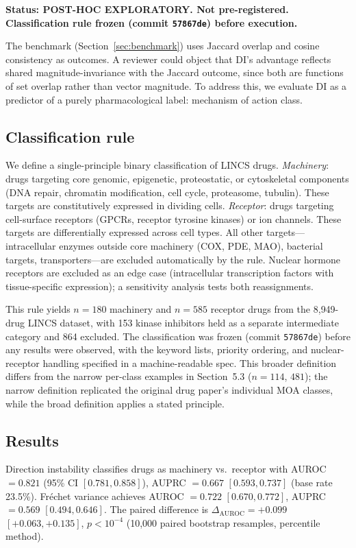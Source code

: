 \documentclass[11pt]{article}
\begin{document}
\textbf{Status: POST-HOC EXPLORATORY. Not pre-registered. Classification
rule frozen (commit \texttt{57867de}) before execution.}

The benchmark (Section~\ref{sec:benchmark}) uses Jaccard overlap and
cosine consistency as outcomes. A reviewer could object that DI's
advantage reflects shared magnitude-invariance with the Jaccard outcome,
since both are functions of set overlap rather than vector magnitude.
To address this, we evaluate DI as a predictor of a purely
pharmacological label: mechanism of action class.

\subsection{Classification rule}

We define a single-principle binary classification of LINCS drugs.
\emph{Machinery}: drugs targeting core genomic, epigenetic, proteostatic,
or cytoskeletal components (DNA repair, chromatin modification, cell
cycle, proteasome, tubulin). These targets are constitutively expressed
in dividing cells. \emph{Receptor}: drugs targeting cell-surface
receptors (GPCRs, receptor tyrosine kinases) or ion channels. These
targets are differentially expressed across cell types. All other
targets---intracellular enzymes outside core machinery (COX, PDE, MAO),
bacterial targets, transporters---are excluded automatically by the
rule. Nuclear hormone receptors are excluded as an edge case
(intracellular transcription factors with tissue-specific expression);
a sensitivity analysis tests both reassignments.

This rule yields $n = 180$ machinery and $n = 585$ receptor drugs from
the 8{,}949-drug LINCS dataset, with 153 kinase inhibitors held as a
separate intermediate category and 864 excluded. The classification
was frozen (commit \texttt{57867de}) before any results were observed,
with the keyword lists, priority ordering, and nuclear-receptor handling
specified in a machine-readable spec. This broader definition differs
from the narrow per-class examples in Section~5.3 ($n = 114$, $481$);
the narrow definition replicated the original drug paper's individual
MOA classes, while the broad definition applies a stated principle.

\subsection{Results}

Direction instability classifies drugs as machinery vs.\ receptor with
AUROC $= 0.821$ (95\% CI $[0.781, 0.858]$), AUPRC $= 0.667$
$[0.593, 0.737]$ (base rate 23.5\%). Fr\'{e}chet variance achieves
AUROC $= 0.722$ $[0.670, 0.772]$, AUPRC $= 0.569$ $[0.494, 0.646]$.
The paired difference is $\Delta_{\text{AUROC}} = +0.099$ $[+0.063,
+0.135]$, $p < 10^{-4}$ (10{,}000 paired bootstrap resamples,
percentile method).
\end{document}
